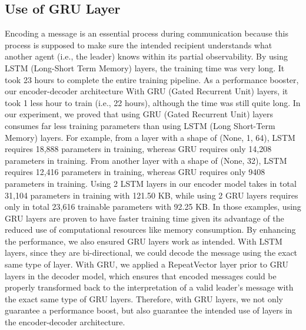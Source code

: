 \documentclass[a4paper,11pt]{article}
\begin{document}
\subsection{Use of GRU Layer}
Encoding a message is an essential process during communication because this process is supposed to make sure the intended recipient understands what another agent (i.e., the leader) knows within its partial observability. By using LSTM (Long-Short Term Memory) layers, the training time was very long. It took 23 hours to complete the entire training pipeline. As a performance booster, our encoder-decoder architecture With GRU (Gated Recurrent Unit) layers, it took 1 less hour to train (i.e., 22 hours), although the time was still quite long. In our experiment, we proved that using GRU (Gated Recurrent Unit) layers consumes far less training parameters than using LSTM (Long Short-Term Memory) layers. For example, from a layer with a shape of (None, 1, 64), LSTM requires 18,888 parameters in training, whereas GRU requires only 14,208 parameters in training. From another layer with a shape of (None, 32), LSTM requires 12,416 parameters in training, whereas GRU requires only 9408 parameters in training. Using 2 LSTM layers in our encoder model takes in total 31,104 parameters in training with 121.50 KB, while using 2 GRU layers requires only in total 23,616 trainable parameters with 92.25 KB. In those examples, using GRU layers are proven to have faster training time given its advantage of the reduced use of computational resources like memory consumption. By enhancing the performance, we also ensured GRU layers work as intended. With LSTM layers, since they are bi-directional, we could decode the message using the exact same type of layer. With GRU, we applied a RepeatVector layer prior to GRU layers in the decoder model, which ensures that encoded messages could be properly transformed back to the interpretation of a valid leader’s message with the exact same type of GRU layers. Therefore, with GRU layers, we not only guarantee a performance boost, but also guarantee the intended use of layers in the encoder-decoder architecture. 
\end{document}
